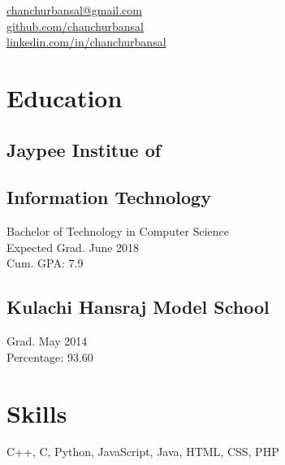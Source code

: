 \documentclass[]{hieudo-build}
\begin{document}
%
%
{
	\faEnvelope \href{mailto:chanchurbansal@gmail.com}{ chanchurbansal@gmail.com}\\
	\faGithub \href{https://github.com/chanchurbansal}{ github.com/chanchurbansal}\\
	\faLinkedinSquare \href{https://www.linkedin.com/in/chanchurbansal/}{ linkedin.com/in/chanchurbansal}
}

    
%
%
\begin{minipage}[t]{0.3\textwidth} 

\section{Education} 

\subsection{Jaypee Institue of }\subsection{Information Technology}
Bachelor of Technology in Computer Science \\
Expected Grad. June 2018 \\
Cum. GPA: 7.9\\
\sectionsep

\subsection{Kulachi Hansraj Model School}
Grad. May 2014  
\\ Percentage: 93.60
\sectionsep


\section{Skills}
C++, C, Python, JavaScript, Java, HTML, CSS, PHP\\ 


\end{minipage}
\end{document}
